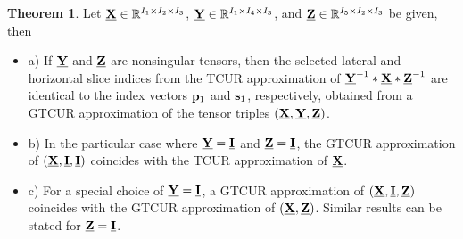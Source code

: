 \documentclass[preprint,12pt]{elsarticle}
\theoremstyle{definition}
\newtheorem{thm}{Theorem}
\newcommand{\cX}{\underline{\bf X}}
\newcommand{\cY}{\underline{\bf Y}}
\newcommand{\cZ}{\underline{\bf Z}}
\newcommand{\I}{{\bf I}}
\begin{document}
\begin{thm} Let $\cX\in\mathbb{R}^{I_1\times I_2\times I_3}$, $\cY\in\mathbb{R}^{I_1\times I_4\times I_3}$, and $\cZ\in\mathbb{R}^{I_5\times I_2\times I_3}$ be given, then

\begin{itemize}
\item a) If $\cY$ and $\cZ$ are nonsingular tensors, then the selected lateral and horizontal slice indices from the TCUR approximation of $\cY^{-1}*\cX*\cZ^{-1}$ are identical to the index vectors ${\bf p}_1$ and ${\bf s}_1$, respectively,  obtained from a GTCUR approximation of the tensor triples $(\cX,\cY,\cZ)$.

\item  b) In the particular case where $\cY = \underline{\I}$ and $\cZ = \underline{\I}$, the GTCUR approximation of $(\cX,\underline{\bf I},\underline{\bf I})$ coincides with the TCUR approximation of $\cX$.

\item c) For a special choice of $\cY=\underline{\bf I}$, a GTCUR approximation of $(\cX,\underline{\bf I},\cZ)$ coincides with the GTCUR approximation of $(\cX,\cZ)$. Similar results can be stated for $\cZ = \underline{\bf I}$.
\end{itemize}
\end{thm}
\end{document}
